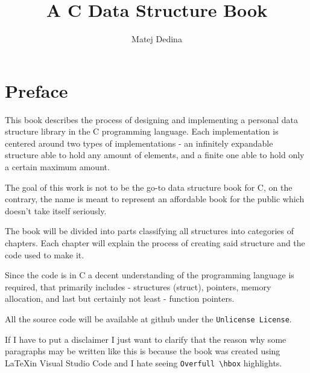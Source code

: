 \documentclass[12pt]{book}
\author{Matej Dedina}
\title{A C Data Structure Book}
\begin{document}
\maketitle

\frontmatter%

% 
% 

\chapter*{Preface}

This book describes the process of designing and implementing a personal data structure library in the C programming language. Each implementation is centered around two types of implementations - an infinitely expandable structure able to hold any amount of elements, and a finite one able to hold only a certain maximum amount.

The goal of this work is not to be the go-to data structure book for C, on the contrary, the name is meant to represent an affordable book for the public which doesn't take itself seriously.

The book will be divided into parts classifying all structures into categories of chapters. Each chapter will explain the process of creating said structure and the code used to make it. 

Since the code is in C a decent understanding of the programming language is required, that primarily includes - structures (struct), pointers, memory allocation, and last but certainly not least - function pointers.

All the source code will be available at github under the {\texttt{Unlicense License}}.

If I have to put a disclaimer I just want to clarify that the reason why some paragraphs may be written like this is because the book was created using \LaTeX in Visual Studio Code and I hate seeing {\texttt{Overfull \textbackslash hbox}} highlights.

% 
% 

\tableofcontents

% 

\mainmatter%










%

%
%
\printindex

\end{document}
